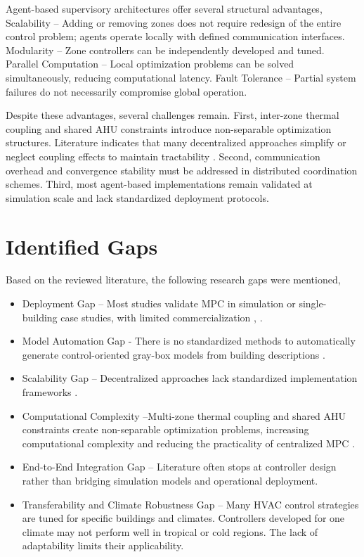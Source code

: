 \documentclass[twocolumn,11pt,a4paper]{article}
\begin{document}
Agent-based supervisory architectures offer several structural advantages,
Scalability – Adding or removing zones does not require redesign of the entire control problem; agents operate locally with defined communication interfaces.
Modularity – Zone controllers can be independently developed and tuned.
Parallel Computation – Local optimization problems can be solved simultaneously, reducing computational latency.
Fault Tolerance – Partial system failures do not necessarily compromise global operation.

Despite these advantages, several challenges remain. First, inter-zone thermal coupling and shared AHU constraints introduce non-separable optimization structures. Literature indicates that many decentralized approaches simplify or neglect coupling effects to maintain tractability \cite{yangHVACEnergyCost2019}. Second, communication overhead and convergence stability must be addressed in distributed coordination schemes. Third, most agent-based implementations remain validated at simulation scale and lack standardized deployment protocols.



\section{Identified Gaps}
Based on the reviewed literature, the following research gaps were mentioned,

\begin{itemize}
    \item Deployment Gap – Most studies validate MPC in simulation or single-building case studies, with limited commercialization \cite{aframTheoryApplicationsHVAC2014}, \cite{balaliEnergyModellingControl2023}.
    \item Model Automation Gap - There is no standardized methods to automatically generate control-oriented gray-box models from building descriptions \cite{balaliEnergyModellingControl2023}.
    \item Scalability Gap – Decentralized approaches lack standardized implementation frameworks \cite{yangHVACEnergyCost2019}.
    \item Computational Complexity –Multi-zone thermal coupling and shared AHU constraints create non-separable optimization problems, increasing computational complexity and reducing the practicality of centralized MPC \cite{yangHVACEnergyCost2019}.
    \item End-to-End Integration Gap – Literature often stops at controller design rather than bridging simulation models and operational deployment.
    \item Transferability and Climate Robustness Gap – Many HVAC control strategies are tuned for specific buildings and climates. Controllers developed for one climate may not perform well in tropical or cold regions. The lack of adaptability limits their applicability.
\end{itemize}
\end{document}
